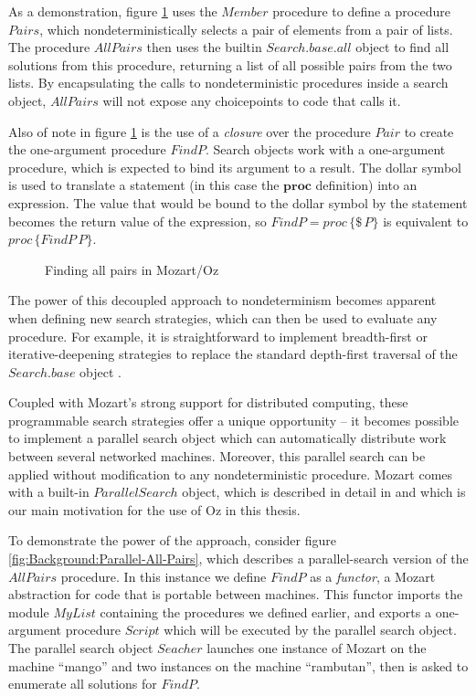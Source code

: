 As a demonstration, figure \ref{fig:Background:All-Pairs} uses the
$Member$ procedure to define a procedure $Pairs$, which nondeterministically
selects a pair of elements from a pair of lists. The procedure $AllPairs$
then uses the builtin $Search.base.all$ object to find all solutions
from this procedure, returning a list of all possible pairs from the
two lists. By encapsulating the calls to nondeterministic procedures
inside a search object, $AllPairs$ will not expose any choicepoints
to code that calls it.

Also of note in figure \ref{fig:Background:All-Pairs} is the use
of a \emph{closure} over the procedure $Pair$ to create the one-argument
procedure $FindP$. Search objects work with a one-argument procedure,
which is expected to bind its argument to a result. The dollar symbol
is used to translate a statement (in this case the $\mathbf{proc}$
definition) into an expression. The value that would be bound to the
dollar symbol by the statement becomes the return value of the expression,
so $FindP=proc\,\{\$\, P\}$ is equivalent to $proc\,\{FindP\, P\}$.

%
\begin{figure}[t]

\caption{Finding all pairs in Mozart/Oz\label{fig:Background:All-Pairs}}

\end{figure}


The power of this decoupled approach to nondeterminism becomes apparent
when defining new search strategies, which can then be used to evaluate
any procedure. For example, it is straightforward to implement breadth-first
or iterative-deepening strategies to replace the standard depth-first
traversal of the $Search.base$ object \citep{schulte00constraint_services}.

Coupled with Mozart's strong support for distributed computing, these
programmable search strategies offer a unique opportunity -- it becomes
possible to implement a parallel search object which can automatically
distribute work between several networked machines. Moreover, this
parallel search can be applied without modification to any nondeterministic
procedure. Mozart comes with a built-in $ParallelSearch$ object,
which is described in detail in \citep{schulte00oz_parallel} and
which is our main motivation for the use of Oz in this thesis.

To demonstrate the power of the approach, consider figure \ref{fig:Background:Parallel-All-Pairs},
which describes a parallel-search version of the $AllPairs$ procedure.
In this instance we define $FindP$ as a \emph{functor}, a Mozart
abstraction for code that is portable between machines. This functor
imports the module $MyList$ containing the procedures we defined
earlier, and exports a one-argument procedure $Script$ which will
be executed by the parallel search object. The parallel search object
$Seacher$ launches one instance of Mozart on the machine {}``mango''
and two instances on the machine {}``rambutan'', then is asked to
enumerate all solutions for $FindP$.

